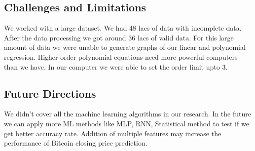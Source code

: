\documentclass{IEEEtran}
\begin{document}
\subsection{Challenges and Limitations}
We worked with a large dataset. We had 48 lacs of data with incomplete data. After the data processing we got around 36 lacs of valid data. For this large amount of data we were unable to generate graphs of our linear and polynomial regression. Higher order polynomial equations need more powerful computers than we have. In our computer we were able to set the order limit upto 3.
\subsection{Future Directions}
We didn’t cover all the machine learning algorithms in our research. In the future we can apply more ML methods like MLP, RNN, Statistical method to test if we get better accuracy rate. Addition of multiple features may increase the performance of Bitcoin closing price prediction.



\end{document}
